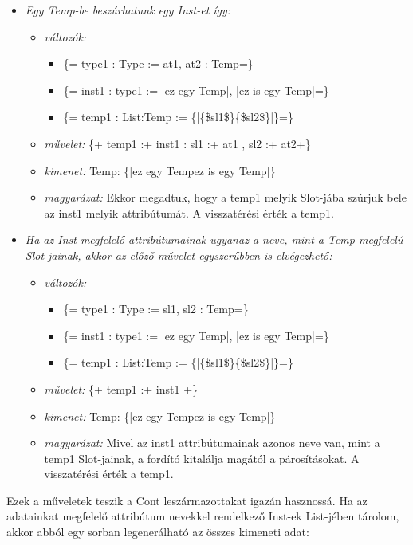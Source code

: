 {\begin{itemize}
\item \emph{ Egy Temp-be beszúrhatunk egy Inst-et így:}
\begin{itemize}
\item \emph{változók:}
\begin{itemize}
\item \{= type1 : Type  := at1, at2 : Temp=\}
\item \{= inst1 : type1  := {|ez egy Temp|}, {|ez is egy Temp|}=\}
\item \{= temp1 : List:Temp  := \{|\{\$sl1\$\}\{\$sl2\$\}|\}=\}
\end{itemize}
\item \emph{művelet:}
\{+ temp1 :+ inst1 : sl1 :+ at1 , sl2 :+ at2+\}
\item \emph{kimenet:}
Temp: \{|ez egy Tempez is egy Temp|\}
\item \emph{magyarázat:}
Ekkor megadtuk, hogy a temp1 melyik Slot-jába szúrjuk bele az inst1 melyik attribútumát.
A visszatérési érték a temp1.
\end{itemize}

\item \emph{ Ha az Inst megfelelő attribútumainak ugyanaz a neve, mint a Temp megfelelú Slot-jainak, akkor az előző művelet egyszerűbben is elvégezhető:}
\begin{itemize}
\item \emph{változók:}
\begin{itemize}
\item \{= type1 : Type  := sl1, sl2 : Temp=\}
\item \{= inst1 : type1  := {|ez egy Temp|}, {|ez is egy Temp|}=\}
\item \{= temp1 : List:Temp  := \{|\{\$sl1\$\}\{\$sl2\$\}|\}=\}
\end{itemize}
\item \emph{művelet:}
\{+ temp1 :+ inst1 +\}
\item \emph{kimenet:}
Temp: \{|ez egy Tempez is egy Temp|\}
\item \emph{magyarázat:}
Mivel az inst1 attribútumainak azonos neve van, mint a temp1 Slot-jainak, a fordító kitalálja magától a párosításokat.
A visszatérési érték a temp1.
\end{itemize}

\end{itemize}
 
Ezek a műveletek teszik a Cont leszármazottakat igazán hasznossá.
Ha az adatainkat megfelelő attribútum nevekkel rendelkező Inst-ek List-jében tárolom,
akkor abból egy sorban legenerálható az összes kimeneti adat:

}
